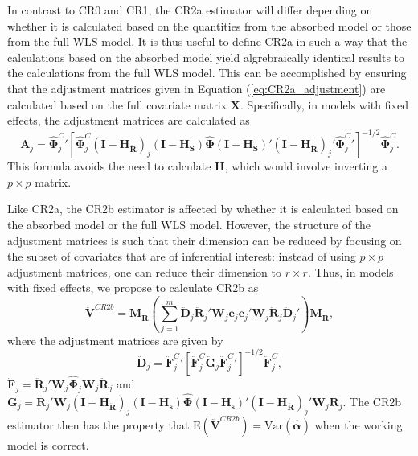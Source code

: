 \documentclass[12pt]{article}\usepackage[]{graphicx}\usepackage[]{color}
\newcommand{\E}{\text{E}}
\newcommand{\Var}{\text{Var}}
\newcommand{\bm}{\mathbf}
\newcommand{\bs}{\boldsymbol}
\begin{document}
In contrast to CR0 and CR1, the CR2a estimator will differ depending on whether it is calculated based on the quantities from the absorbed model or those from the full WLS model. 
It is thus useful to define CR2a in such a way that the calculations based on the absorbed model yield algrebraically identical results to the calculations from the full WLS model. 
This can be accomplished by ensuring that the adjustment matrices given in Equation (\ref{eq:CR2a_adjustment}) are calculated based on the full covariate matrix $\bm{X}$. Specifically, in models with fixed effects, the adjustment matrices are calculated as 
\begin{equation}
\label{eq:CR2_panel_adjustment}
\bm{A}_j = {\bs{\hat\Phi}_j^C}' \left[\hat{\bs\Phi}_j^C\left(\bm{I} - \bm{H_{\ddot{R}}}\right)_j \left(\bm{I} - \bm{H_S}\right) \hat{\bs\Phi} \left(\bm{I} - \bm{H_S}\right)' \left(\bm{I} - \bm{H_{\ddot{R}}}\right)_j' {\bs{\hat\Phi}_j^C}' \right]^{-1/2}\hat{\bs\Phi}_j^C.
\end{equation}
This formula avoids the need to calculate $\bm{H}$, which would involve inverting a $p \times p$ matrix.

Like CR2a, the CR2b estimator is affected by whether it is calculated based on the absorbed model or the full WLS model. However, the structure of the adjustment matrices is such that their dimension can be reduced by focusing on the subset of covariates that are of inferential interest: instead of using $p \times p$ adjustment matrices, one can reduce their dimension to $r \times r$. Thus, in models with fixed effects, we propose to calculate CR2b as 
\begin{equation}
\label{eq:V_CR2b_FE}
\bm{\ddot{V}}^{CR2b} = \bm{M_{\ddot{R}}} \left(\sum_{j=1}^m \bm{\ddot{D}}_j \bm{\ddot{R}}_j' \bm{W}_j \bm{e}_j \bm{e}_j' \bm{W}_j \bm{\ddot{R}}_j \bm{\ddot{D}}_j'\right) \bm{M_{\ddot{R}}},
\end{equation}
where the adjustment matrices are given by 
\begin{equation}
\bm{\ddot{D}}_j = \bm{\ddot{F}}_j^C{}'\left[\bm{\ddot{F}}_j^C \bm{\ddot{G}}_j \bm{\ddot{F}}_j^C{}'\right]^{-1/2}\bm{\ddot{F}}_j^C,
\end{equation}
$\bm{\ddot{F}}_j = \bm{\ddot{R}}_j' \bm{W}_j \hat{\bs\Phi}_j \bm{W}_j \bm{\ddot{R}}_j$ and $\bm{\ddot{G}}_j = \bm{\ddot{R}}_j' \bm{W}_j \left(\bm{I} - \bm{H_{\ddot{R}}}\right)_j  \left(\bm{I} - \bm{H_s}\right) \hat{\bs\Phi} \left(\bm{I} - \bm{H_s}\right)' \left(\bm{I} - \bm{H_{\ddot{R}}}\right)_j' \bm{W}_j \bm{\ddot{R}}_j$. The CR2b estimator then has the property that $\E\left(\bm{\ddot{V}}^{CR2b}\right) = \Var\left(\bs{\hat\alpha}\right)$ when the working model is correct.
\end{document}

